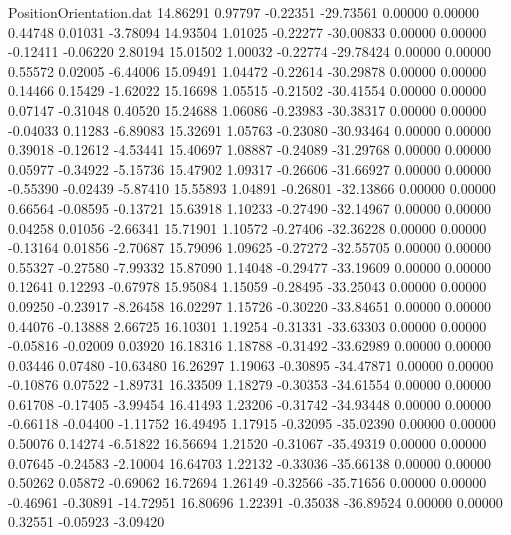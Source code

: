 \begin{filecontents}{PositionOrientation.dat}
  14.86291    0.97797   -0.22351   -29.73561    0.00000    0.00000    0.44748    0.01031   -3.78094
  14.93504    1.01025   -0.22277   -30.00833    0.00000    0.00000   -0.12411   -0.06220    2.80194
  15.01502    1.00032   -0.22774   -29.78424    0.00000    0.00000    0.55572    0.02005   -6.44006
  15.09491    1.04472   -0.22614   -30.29878    0.00000    0.00000    0.14466    0.15429   -1.62022
  15.16698    1.05515   -0.21502   -30.41554    0.00000    0.00000    0.07147   -0.31048    0.40520
  15.24688    1.06086   -0.23983   -30.38317    0.00000    0.00000   -0.04033    0.11283   -6.89083
  15.32691    1.05763   -0.23080   -30.93464    0.00000    0.00000    0.39018   -0.12612   -4.53441
  15.40697    1.08887   -0.24089   -31.29768    0.00000    0.00000    0.05977   -0.34922   -5.15736
  15.47902    1.09317   -0.26606   -31.66927    0.00000    0.00000   -0.55390   -0.02439   -5.87410
  15.55893    1.04891   -0.26801   -32.13866    0.00000    0.00000    0.66564   -0.08595   -0.13721
  15.63918    1.10233   -0.27490   -32.14967    0.00000    0.00000    0.04258    0.01056   -2.66341
  15.71901    1.10572   -0.27406   -32.36228    0.00000    0.00000   -0.13164    0.01856   -2.70687
  15.79096    1.09625   -0.27272   -32.55705    0.00000    0.00000    0.55327   -0.27580   -7.99332
  15.87090    1.14048   -0.29477   -33.19609    0.00000    0.00000    0.12641    0.12293   -0.67978
  15.95084    1.15059   -0.28495   -33.25043    0.00000    0.00000    0.09250   -0.23917   -8.26458
  16.02297    1.15726   -0.30220   -33.84651    0.00000    0.00000    0.44076   -0.13888    2.66725
  16.10301    1.19254   -0.31331   -33.63303    0.00000    0.00000   -0.05816   -0.02009    0.03920
  16.18316    1.18788   -0.31492   -33.62989    0.00000    0.00000    0.03446    0.07480  -10.63480
  16.26297    1.19063   -0.30895   -34.47871    0.00000    0.00000   -0.10876    0.07522   -1.89731
  16.33509    1.18279   -0.30353   -34.61554    0.00000    0.00000    0.61708   -0.17405   -3.99454
  16.41493    1.23206   -0.31742   -34.93448    0.00000    0.00000   -0.66118   -0.04400   -1.11752
  16.49495    1.17915   -0.32095   -35.02390    0.00000    0.00000    0.50076    0.14274   -6.51822
  16.56694    1.21520   -0.31067   -35.49319    0.00000    0.00000    0.07645   -0.24583   -2.10004
  16.64703    1.22132   -0.33036   -35.66138    0.00000    0.00000    0.50262    0.05872   -0.69062
  16.72694    1.26149   -0.32566   -35.71656    0.00000    0.00000   -0.46961   -0.30891  -14.72951
  16.80696    1.22391   -0.35038   -36.89524    0.00000    0.00000    0.32551   -0.05923   -3.09420

\end{filecontents}
